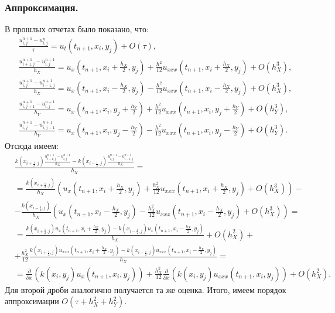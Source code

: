 \documentclass[14pt,a4paper]{extarticle}
\newcommand{\1}{\mathbbm{1}}
\begin{document}
\subsubsection{Аппроксимация.}
В прошлых отчетах было показано, что:
\begin{align*}
    &\frac{u^{n+1}_{i,j} - u^n_{i,j}}{\tau} = u_t(t_{n+1}, x_i, y_j) + O(\tau), \\
    &\frac{u^{n+1}_{i+1, j} - u^{n+1}_{i, j}}{h_X} = u_x(t_{n+1}, x_i + \frac{h_X}{2}, y_j) + \frac{h^2}{12}u_{xxx}(t_{n+1}, x_i + \frac{h_X}{2}, y_j) + O(h_X^3), \\
    &\frac{u^{n+1}_{i, j} - u^{n+1}_{i-1, j}}{h_X} = u_x(t_{n+1}, x_i - \frac{h_X}{2}, y_j) - \frac{h^2}{12}u_{xxx}(t_{n+1}, x_i - \frac{h_X}{2}, y_j) + O(h_X^3), \\
    &\frac{u^{n+1}_{i, j+1} - u^{n+1}_{i, j}}{h_Y} = u_x(t_{n+1}, x_i, y_j+ \frac{h_Y}{2})  + \frac{h^2}{12}u_{xxx}(t_{n+1}, x_i, y_j+ \frac{h_Y}{2})+ O(h_Y^3), \\
    &\frac{u^{n+1}_{i, j} - u^{n+1}_{i, j-1}}{h_Y} = u_x(t_{n+1}, x_i, y_j- \frac{h_Y}{2})  - \frac{h^2}{12}u_{xxx}(t_{n+1}, x_i, y_j- \frac{h_Y}{2})+ O(h_Y^3).
\end{align*}
Отсюда имеем:
\begin{align*}
    &\frac{k(x_{i + \frac{1}{2}, j}) \frac{u^{n+1}_{i+1, j} - u^{n+1}_{i, j}}{h_X} 
    - k(x_{i- \frac{1}{2}, j}) \frac{u^{n+1}_{i, j} - u^{n+1}_{i-1, j}}{h_X}}{h_X} =\\
    &= \frac{k(x_{i + \frac{1}{2}, j})}{h_X} \left(u_x(t_{n+1}, x_i + \frac{h_X}{2}, y_j) + \frac{h_X^2}{12}u_{xxx}(t_{n+1}, x_i + \frac{h_X}{2}, y_j) + O(h_X^3)\right) - \\
    &- \frac{k(x_{i- \frac{1}{2}, j}) }{h_X}\left(u_x(t_{n+1}, x_i - \frac{h_X}{2}, y_j) -  \frac{h_X^2}{12}u_{xxx}(t_{n+1}, x_i - \frac{h_X}{2}, y_j) + O(h_X^3)\right) = \\
    &=\frac{k(x_{i + \frac{1}{2}, j}) u_x(t_{n+1}, x_i + \frac{h_X}{2}, y_j) - k(x_{i- \frac{1}{2}, j})u_x(t_{n+1}, x_i - \frac{h_X}{2}, y_j)}{h_X} + O(h_X^2) +\\
    &+\frac{h_X^2}{12} \frac{k(x_{i + \frac{1}{2}, j}) u_{xxx}(t_{n+1}, x_i + \frac{h_X}{2}, y_j) 
    - k(x_{i- \frac{1}{2}, j}) u_{xxx}(t_{n+1}, x_i - \frac{h_X}{2}, y_j)}{h_X} = \\
    &= \frac{\partial}{\partial x} \left(k(x_i, y_j)u_{x}(t_{n+1}, x_i, y_j)\right) 
    + \frac{h_X^2}{12} \frac{\partial}{\partial x} \left(k(x_i, y_j)u_{xxx}(t_{n+1}, x_i, y_j)\right) + O(h_X^2).
\end{align*}
Для второй дроби аналогично получается та же оценка. Итого, имеем порядок аппроксимации $O(\tau + h_X^2 + h_Y^2)$.
\end{document}
